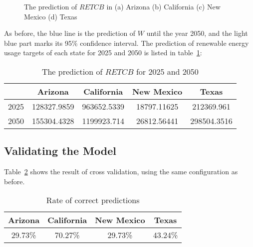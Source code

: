 \documentclass{mcmthesis}
\begin{document}
\begin{figure}[!h]
\hspace{\fill}
\hspace{\fill}
\hspace{\fill}
\hspace{\fill}
    \caption{The prediction of $RETCB$ in (a) Arizona (b) California (c) New Mexico (d) Texas}
    \label{fig:re-prediction}
\end{figure}

As before, the blue line is the prediction of $W$ until the year 2050, and the light blue part marks its 95\% confidence interval. The prediction of renewable energy usage targets of each state for 2025 and 2050 is listed in table~\ref{table:re-prediction}:

\begin{table}[h]
\centering
\begin{tabular}{rcccc}
& Arizona & California & New Mexico & Texas \\ \hline
2025 & 128327.9859 & 963652.5339 & 18797.11625 & 212369.961 \\
2050 & 155304.4328 & 1199923.714 & 26812.56441 & 298504.3516
\end{tabular}
\caption{The prediction of $RETCB$ for 2025 and 2050}
\label{table:re-prediction}
\end{table}

\subsection{Validating the Model}
Table~\ref{table:re-cross-validation} shows the result of cross validation, using the same configuration as before.
\begin{table}[h]
\centering
\begin{tabular}{cccc}
Arizona & California & New Mexico & Texas \\ \hline
29.73\% & 70.27\% & 29.73\% & 43.24\%
\end{tabular}
\caption{Rate of correct predictions}
\label{table:re-cross-validation}
\end{table}
\end{document}
